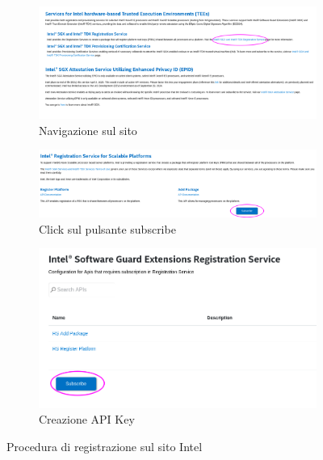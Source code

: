 \documentclass{article}
\begin{document}
\begin{figure}[h]
\centering
\begin{subfigure}{.5\textwidth}
  \centering
  \includegraphics[width=.95\textwidth]{figures/ch3/intel-portal-1.png}
  \caption{Navigazione sul sito}
\end{subfigure}%
\begin{subfigure}{.5\textwidth}
  \centering
  \includegraphics[width=.95\textwidth]{figures/ch3/intel-portal-2.png}
  \caption{Click sul pulsante subscribe}
\end{subfigure}
\begin{subfigure}{.5\textwidth}
  \centering
  \includegraphics[width=.95\textwidth]{figures/ch3/intel-portal-3.png}
  \caption{Creazione API Key}
\end{subfigure}
\caption{Procedura di registrazione sul sito Intel}
\label{fig:intel-portal-registration}
\end{figure}
\end{document}
